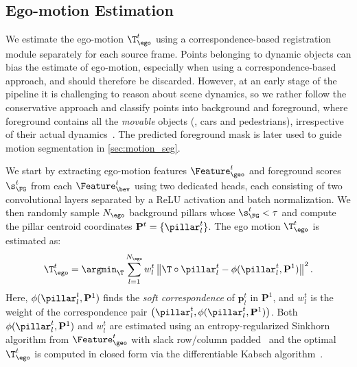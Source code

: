 
\subsection{Ego-motion Estimation}
\label{sec:ego_motion}
We estimate the ego-motion $\T_\ego^t$ using a correspondence-based registration module separately for each source frame. Points belonging to dynamic objects can bias the estimate of ego-motion, especially when using a correspondence-based approach, and should therefore be discarded. 
However, at an early stage of the pipeline it is challenging to reason about scene dynamics, so we rather follow the conservative approach and classify points into background and foreground, where foreground contains all the \emph{movable} objects (\eg, cars and pedestrians), irrespective of their actual dynamics~\cite{gojcic2021weakly}. 
The predicted foreground mask is later used to guide motion segmentation in \cref{sec:motion_seg}.

We start by extracting ego-motion features $\Feature^t_\geo$ and foreground scores $\s^t_\FG$ from each $\Feature_\bev^t$ using two dedicated heads, each consisting of two convolutional layers separated by a ReLU activation and batch normalization. We then randomly sample $N_\ego$ background pillars whose $\s^t_\FG < \tau$ and compute the pillar centroid coordinates $\mathbf{P}^t = \{\pillar_l^t \}$. The ego motion $\T^t_\ego$ is estimated as:
\begin{equation}
{\T^t_\ego} = \argmin_{\T} \sum_{l=1}^{N_\ego} w_l^t \left\|\T \circ \pillar_l^t - \phi(\pillar_l^t, \mathbf{P}^1)\right\|^2. 
\label{eq: ego-motion}
\end{equation}
%
Here, $\phi(\pillar_l^t, \mathbf{P}^1)$ finds the \emph{soft correspondence} of $\mathbf{p}_l^t$ in $\mathbf{P}^1$, and $w_l^t$ is the weight of the correspondence pair $\big(\pillar_l^t, \phi(\pillar_l^t, \mathbf{P}^1)\big)$. Both $\phi(\pillar_l^t, \mathbf{P}^1)$ and $w_l^t$ are estimated using an entropy-regularized Sinkhorn algorithm from $\Feature_\geo^t$ with slack row/column padded~\cite{cuturi2013sinkhorn,yew2020rpm} and the optimal $\T^t_\ego$ is computed in closed form via the differentiable Kabsch algorithm~\cite{kabsch1976solution}.

